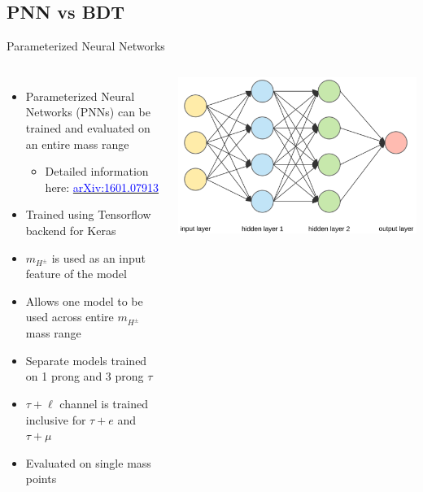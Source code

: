 \documentclass[aspectratio=169,xcolor=table]{beamer}
\begin{document}
  \subsection{PNN vs BDT}

    \begin{frame}[t]{Parameterized Neural Networks}
      \begin{columns}
      \begin{itemize}
        \small
        \item Parameterized Neural Networks (PNNs) can be trained and evaluated on an entire mass range
        \begin{itemize}
          \item Detailed information here: \href{https://arxiv.org/abs/1601.07913}{\textcolor{blue}{arXiv:1601.07913}}
        \end{itemize}
        \item Trained using Tensorflow backend for Keras
        \item $m_{H^{\pm}}$ is used as an input feature of the model
        \item Allows one model to be used across entire $m_{H^{\pm}}$ mass range
        \item Separate models trained on 1 prong and 3 prong $\tau$
        \item $\tau+\ell$ channel is trained inclusive for $\tau+e$ and $\tau+\mu$
        \item Evaluated on single mass points
      \end{itemize}
      \footnotesize
      \centering
      \includegraphics[width=\textwidth,keepaspectratio=true]{NN_Diagram.png}  

\end{columns}
\end{frame}
\end{document}
